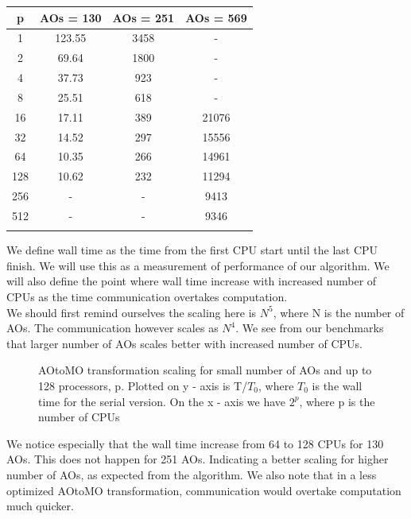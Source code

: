 \documentclass[a4paper,norsk,11pt,twoside]{report}
\begin{document}
 \begin{center}
  \begin{tabular}{ c  c  c  c }
  \hline
     p & AOs = 130 & AOs = 251 & AOs = 569  \\ \hline
     1 & 123.55 & 3458  & - \\
     2 & 69.64 & 1800  & - \\
	 4 & 37.73 & 923  & -  \\
     8 & 25.51 & 618  & -  \\
    16 & 17.11 & 389  & 21076 \\
    32 & 14.52 & 297  & 15556 \\
    64 & 10.35 & 266  & 14961 \\
    128 & 10.62 & 232  & 11294
\\
    256 & - & -  & 9413
\\
    512 & - & -  & 9346
    
     \\ \hline \\
  \end{tabular} 
\end{center} 

We define wall time as the time from the first CPU start until the last CPU finish. We will use this as a measurement of performance of our algorithm. We will also define the point where wall time increase with increased number of CPUs as the time communication overtakes computation. \\

We should first remind ourselves the scaling here is $N^5$, where N is the number of AOs. The communication however scales as $N^4$. We see from our benchmarks that larger number of AOs scales better with increased number of CPUs. \\

\begin{figure}[h!]
\begin{center}
\caption{AOtoMO transformation scaling for small number of AOs and up to 128 processors, p. Plotted on y - axis is T/$T_0$, where $T_0$ is the wall time for the serial version. On the x - axis we have $2^p$, where p is the number of CPUs}
\label{fig:aotomo1}
\end{center}
\end{figure}

We notice especially that the wall time increase from 64 to 128 CPUs for 130 AOs. This does not happen for 251 AOs. Indicating a better scaling for higher number of AOs, as expected from the algorithm. We also note that in a less optimized AOtoMO transformation, communication would overtake computation much quicker. \\
\end{document}
